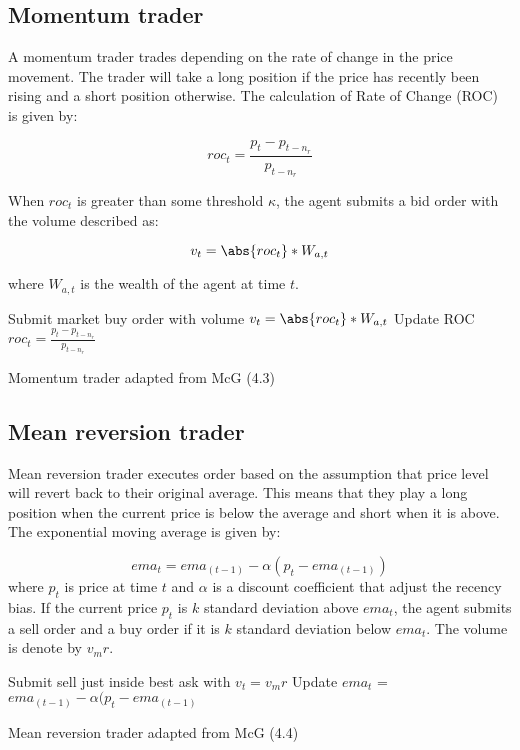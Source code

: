 \subsection{Momentum trader}
A momentum trader trades depending on the rate of change in the price movement. The trader will take a long position if the price has recently been rising and a short position otherwise. The calculation of Rate of Change (ROC) is given by: 

    \[ roc_t = \frac{p_t - p_{t-n_r}}{p_{t-n_r}} \]
    
When $roc_t$ is greater than some threshold $\kappa$, the agent submits a bid order with the volume described as:

    \[ v_t = \abs{roc_t} * W_{a,t} \]
    
where $W_{a,t}$ is the wealth of the agent at time $t$. 

\begin{algorithm}[H]
\DontPrintSemicolon 
{} {
     {
    Submit market buy order with volume $v_t = \abs{roc_t} * W_{a,t}$\;
    }
    \EndIf
  }
\EndIf
Update ROC $roc_t = \frac{p_t - p_{t-n_r}}{p_{t-n_r}}$\;  
\caption{{\sc Momentum trader adapted from McG (4.3) \cite{McGroarty} } }
\label{algo:max}
\end{algorithm}


\subsection{Mean reversion trader}
Mean reversion trader executes order based on the assumption that price level will revert back to their original average. This means that they play a long position when the current price is below the average and short when it is above. The exponential moving average is given by: 

\[ ema_t = ema_{(t-1)} - \alpha(p_t - ema_{(t-1)}) \] where $p_t$ is price at time $t$ and $\alpha$ is a discount coefficient that adjust the recency bias. If the current price $p_t$ is $k$ standard deviation above $ema_t$, the agent submits a sell order and a buy order if it is $k$ standard deviation below $ema_t$. The volume is denote by $v_mr$.

\begin{algorithm}[H]
\DontPrintSemicolon 
{} {
     {
    Submit sell just inside best ask with $v_t = v_mr$\;
    }
    \EndIf
  }
\EndIf
Update $ema_t$ = $ema_{(t-1)} - \alpha(p_t - ema_{(t-1)}$
\caption{{\sc Mean reversion trader adapted from McG (4.4) \cite{McGroarty}} }
\label{algo:max}
\end{algorithm}


